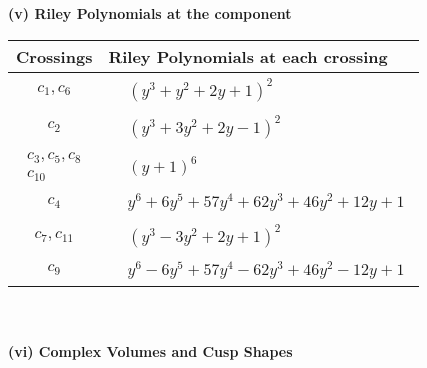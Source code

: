 \documentclass[1p]{elsarticle_modified}
\theoremstyle{definition}
\begin{document}
\newpage\renewcommand{\arraystretch}{1}
\flushleft \textbf{(v) Riley Polynomials at the component}\newline \\
\begin{tabular}{m{50pt}|m{274pt}}
Crossings & \hspace{64pt}Riley Polynomials at each crossing \\
\hline $$\begin{aligned}c_{1},c_{6}\end{aligned}$$&$\begin{aligned}
&(y^3+y^2+2 y+1)^2
\end{aligned}$\\
\hline $$\begin{aligned}c_{2}\end{aligned}$$&$\begin{aligned}
&(y^3+3 y^2+2 y-1)^2
\end{aligned}$\\
\hline $$\begin{aligned}c_{3},c_{5},c_{8}\\c_{10}\end{aligned}$$&$\begin{aligned}
&(y+1)^6
\end{aligned}$\\
\hline $$\begin{aligned}c_{4}\end{aligned}$$&$\begin{aligned}
&y^6+6 y^5+57 y^4+62 y^3+46 y^2+12 y+1
\end{aligned}$\\
\hline $$\begin{aligned}c_{7},c_{11}\end{aligned}$$&$\begin{aligned}
&(y^3-3 y^2+2 y+1)^2
\end{aligned}$\\
\hline $$\begin{aligned}c_{9}\end{aligned}$$&$\begin{aligned}
&y^6-6 y^5+57 y^4-62 y^3+46 y^2-12 y+1
\end{aligned}$\\
\hline
\end{tabular}\\~\\
\newpage\flushleft \textbf{(vi) Complex Volumes and Cusp Shapes}
\end{document}
